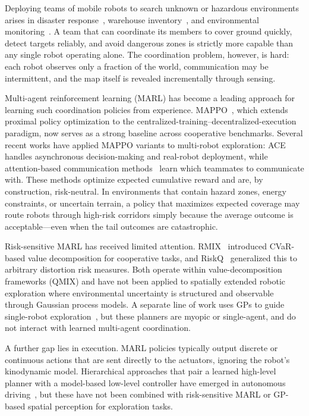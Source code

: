 \documentclass[letterpaper]{IEEEtran}
\begin{document}
Deploying teams of mobile robots to search unknown or hazardous environments arises in disaster response~\cite{murphy2016disaster}, warehouse inventory~\cite{azadeh2019robotized}, and environmental monitoring~\cite{dunbabin2012robots}. A team that can coordinate its members to cover ground quickly, detect targets reliably, and avoid dangerous zones is strictly more capable than any single robot operating alone. The coordination problem, however, is hard: each robot observes only a fraction of the world, communication may be intermittent, and the map itself is revealed incrementally through sensing.

Multi-agent reinforcement learning (MARL) has become a leading approach for learning such coordination policies from experience. MAPPO~\cite{yu2022surprising}, which extends proximal policy optimization to the centralized-training--decentralized-execution paradigm, now serves as a strong baseline across cooperative benchmarks. Several recent works have applied MAPPO variants to multi-robot exploration: ACE~\cite{yu2023asynchronous} handles asynchronous decision-making and real-robot deployment, while attention-based communication methods~\cite{geng2019learning} learn which teammates to communicate with. These methods optimize expected cumulative reward and are, by construction, risk-neutral. In environments that contain hazard zones, energy constraints, or uncertain terrain, a policy that maximizes expected coverage may route robots through high-risk corridors simply because the average outcome is acceptable---even when the tail outcomes are catastrophic.

Risk-sensitive MARL has received limited attention. RMIX~\cite{qiu2022rmix} introduced CVaR-based value decomposition for cooperative tasks, and RiskQ~\cite{shen2023riskq} generalized this to arbitrary distortion risk measures. Both operate within value-decomposition frameworks (QMIX) and have not been applied to spatially extended robotic exploration where environmental uncertainty is structured and observable through Gaussian process models. A separate line of work uses GPs to guide single-robot exploration~\cite{chen2024adaptive, marchant2014bayesian}, but these planners are myopic or single-agent, and do not interact with learned multi-agent coordination.

A further gap lies in execution. MARL policies typically output discrete or continuous actions that are sent directly to the actuators, ignoring the robot's kinodynamic model. Hierarchical approaches that pair a learned high-level planner with a model-based low-level controller have emerged in autonomous driving~\cite{liu2024safermm, studt2025hierarchical}, but these have not been combined with risk-sensitive MARL or GP-based spatial perception for exploration tasks.
\end{document}
